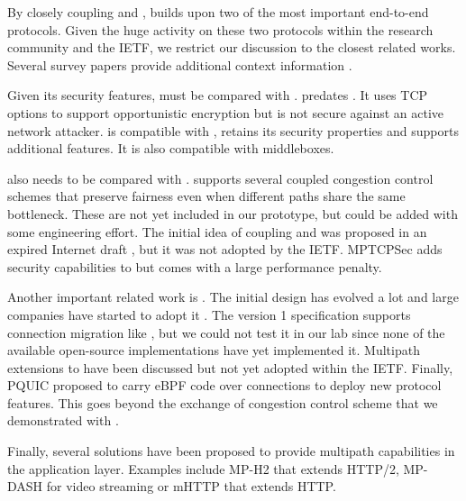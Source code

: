 
By closely coupling \tcp and \tls, \tcpls builds upon two of the most important
end-to-end protocols. Given the huge activity on these two protocols within the
research community and the IETF, we restrict our discussion to the closest
related works. Several survey papers provide additional context information
\cite{polese2019survey,li2016multipath,papastergiou2016ossifying}.

Given its security features, \tcpls must be compared with \tcpcrypt
\cite{bittau2010case,rfc8548}. \tcpcrypt predates . It uses TCP options
to support opportunistic encryption but is not secure against an active network
attacker. \tcpls is compatible with \tls, retains its security properties and supports
additional features. It is also compatible with \tcp middleboxes.

\tcpls also needs to be compared with \mptcp \cite{raiciu2012hard,rfc6824}.
\mptcp supports several coupled congestion control schemes
\cite{peng2014multipath,wischik2011design,khalili2013mptcp} that preserve
fairness even when different paths share the same bottleneck. These are not yet
included in our \tcpls prototype, but could be added with some engineering
effort. The initial idea of coupling \mptcp and \tls was proposed in an expired
Internet draft \cite{draft-paasch-mptcp-ssl-00}, but it was not adopted by the
IETF. MPTCPSec \cite{jadin2017securing} adds security capabilities to \mptcp but
comes with a large performance penalty.

Another important related work is \quic. The initial design
\cite{roskind2013quic} has evolved a lot and large companies have started to
adopt it \cite{10.1145/3098822.3098842,Joras_mvfst,marx2020same}. The \quic
version 1 specification \cite{draft-ietf-quic-transport} supports connection
migration like \tcpls, but we could not test it in our lab since none of the
available open-source implementations have yet implemented it. Multipath
extensions
\cite{viernickel2018multipath,de2017multipath,draft-deconinck-quic-multipath-06,draft-liu-multipath-quic-02}
to \quic have been discussed but not yet adopted within the IETF. Finally, PQUIC
\cite{de2019pluginizing} proposed to carry eBPF code over \quic connections to
deploy new protocol features. This goes beyond the exchange of congestion
control scheme that we demonstrated with \tcpls.

Finally, several solutions have been proposed to provide multipath capabilities
in the application layer. Examples include MP-H2 \cite{nikravesh2019mp} that
extends HTTP/2, MP-DASH \cite{han2016mp} for video streaming or mHTTP
\cite{kim2014multi} that extends HTTP.


